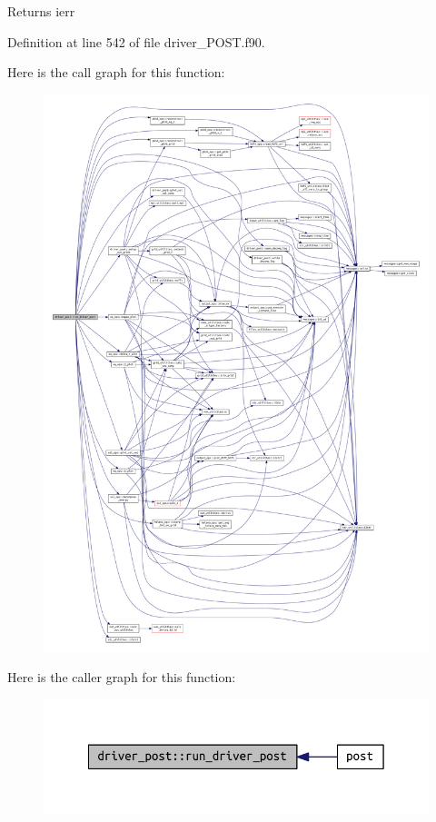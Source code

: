 \begin{DoxyReturn}{Returns}
ierr 
\end{DoxyReturn}


Definition at line 542 of file driver\+\_\+\+P\+O\+S\+T.\+f90.

Here is the call graph for this function\+:\nopagebreak
\begin{figure}[H]
\begin{center}
\leavevmode
\includegraphics[width=350pt]{namespacedriver__post_a33b3c6f9018a0ddc92dce77394b8ab37_cgraph}
\end{center}
\end{figure}
Here is the caller graph for this function\+:\nopagebreak
\begin{figure}[H]
\begin{center}
\leavevmode
\includegraphics[width=342pt]{namespacedriver__post_a33b3c6f9018a0ddc92dce77394b8ab37_icgraph}
\end{center}
\end{figure}
\mbox{\label{namespacedriver__post_a3438685c5fb7302f756c368fb5f940ee}} 
